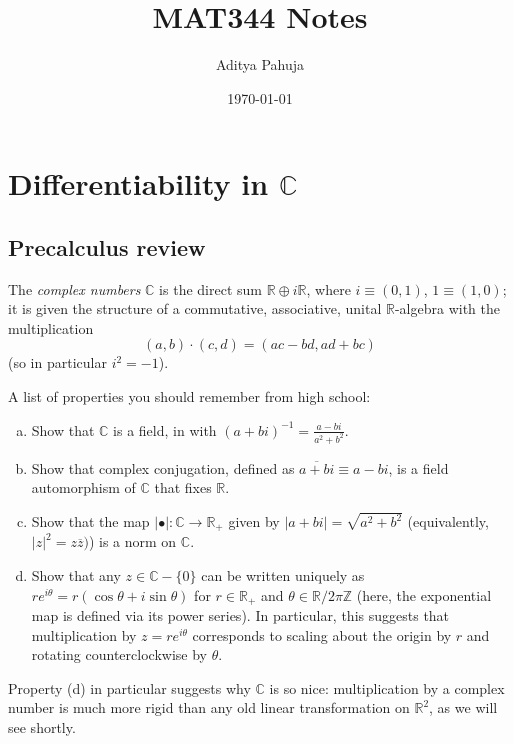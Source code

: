 \documentclass[10pt]{article}
\title{\vspace{-2.0cm}MAT344 Notes}
\author{\large Aditya Pahuja}
\date{\large \today}
\renewcommand{\setminus}{\!-\!}
\providecommand{\ol}{\overline}
\providecommand{\CC}{\mathbb C}
\providecommand{\RR}{\mathbb R}
\providecommand{\ZZ}{\mathbb Z}
\providecommand{\ii}{\item}
\providecommand{\inv}{^{-1}}
\providecommand{\abs}[1]{\left\lvert{#1}\right\rvert}
\providecommand{\vocab}[1]{{{\sffamily\textit{#1}}}}
\begin{document}
\maketitle
\tableofcontents
\pagebreak

\section{Differentiability in $\CC$}

\setcounter{subsection}{-1}
\subsection{Precalculus review}

\begin{definition}[$\CC$]
    \label{def:complex-numbers}
    The \vocab{complex numbers} $\CC$ is the direct sum
    $\RR\oplus i\RR$, where $i\equiv(0,1)$, $1\equiv(1,0)$;
    it is given the structure of a commutative,
    associative, unital $\RR$-algebra with the multiplication
    \begin{equation*}
	(a,b)\cdot(c,d) = (ac-bd,ad+bc)
    \end{equation*}
    (so in particular $i^2 = -1$).
\end{definition}

\begin{exercise}
    A list of properties you should remember from high school:
    \begin{enumerate}[(a)]
        \ii Show that $\CC$ is a field, in with
	$(a+bi)\inv = \frac{a-bi}{a^2+b^2}$.
	\ii Show that complex conjugation, defined as
	$\ol{a+bi}\equiv a-bi$, is a field automorphism of $\CC$
	that fixes $\RR$.
	\ii Show that the map $\abs{\bullet}\colon\CC\to\RR_+$
	given by $\abs{a+bi} = \sqrt{a^2+b^2}$
	(equivalently, $\abs{z}^2 = z\ol z)$)
	is a norm on $\CC$.
	\ii Show that any $z\in\CC\setminus\{0\}$
	can be written uniquely as
	$re^{i\theta} = r(\cos\theta + i\sin\theta)$
	for $r\in\RR_+$ and $\theta\in\RR/2\pi\ZZ$
	(here, the exponential map is defined via its power series).
	In particular, this suggests that multiplication by $z=re^{i\theta}$
	corresponds to scaling about the origin by $r$
	and rotating counterclockwise by $\theta$.
    \end{enumerate}
\end{exercise}

Property (d) in particular suggests why $\CC$ is so nice:
multiplication by a complex number is much more rigid than
any old linear transformation on $\RR^2$, as we will see shortly.
\end{document}

